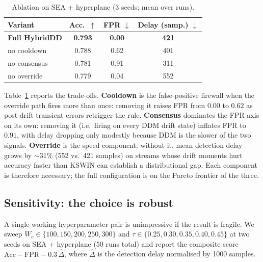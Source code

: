 \documentclass[conference]{IEEEtran}
\begin{document}
\begin{table}[t]
\centering
\caption{Ablation on SEA + hyperplane (3 seeds; mean over runs).}
\label{tab:ablation}
\begin{tabular}{lccc}
\toprule
\textbf{Variant}        & \textbf{Acc.\ $\uparrow$} & \textbf{FPR $\downarrow$} & \textbf{Delay (samp.) $\downarrow$} \\
\midrule
\textbf{Full HybridDD}  & \textbf{0.793}            & \textbf{0.00}             & \textbf{421} \\
no cooldown             & 0.788                     & 0.62                      & 401 \\
no consensus            & 0.781                     & 0.91                      & 311 \\
no override             & 0.779                     & 0.04                      & 552 \\
\bottomrule
\end{tabular}
\end{table}

Table~\ref{tab:ablation} reports the trade-offs.
\textbf{Cooldown} is the false-positive firewall when the override path
fires more than once: removing it raises FPR from $0.00$ to $0.62$ as
post-drift transient errors retrigger the rule.
\textbf{Consensus} dominates the FPR axis on its own: removing it (i.e.\
firing on every DDM drift state) inflates FPR to $0.91$, with delay
dropping only modestly because DDM is the slower of the two signals.
\textbf{Override} is the speed component: without it, mean detection
delay grows by $\sim$31\% (552 vs.\ 421 samples) on streams whose drift
moments hurt accuracy faster than KSWIN can establish a distributional
gap. Each component is therefore necessary; the full configuration is on
the Pareto frontier of the three.

\subsection{Sensitivity: the choice is robust}
\label{sec:sensitivity}

A single working hyperparameter pair is unimpressive if the result is
fragile. We sweep
$W_c \in \{100, 150, 200, 250, 300\}$ and
$\tau \in \{0.25, 0.30, 0.35, 0.40, 0.45\}$ at two seeds on SEA +
hyperplane (50 runs total) and report the composite score
$\text{Acc} - \text{FPR} - 0.3\,\widehat{\Delta}$, where
$\widehat{\Delta}$ is the detection delay normalised by 1000 samples.
\end{document}
